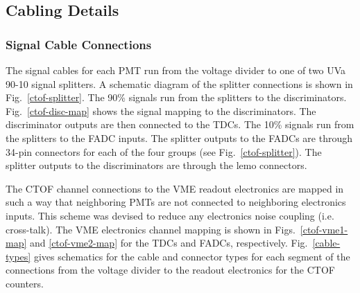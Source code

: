 \documentclass[12pt]{article}
\begin{document}
\subsection{Cabling Details}

\subsubsection{Signal Cable Connections}
\label{signal-conn}

The signal cables for each PMT run from the voltage divider to one of two UVa 90-10 signal
splitters. A schematic diagram of the splitter connections is shown in Fig.~\ref{ctof-splitter}. 
The 90\% signals run from the splitters to the discriminators. Fig.~\ref{ctof-disc-map} shows
the signal mapping to the discriminators. The discriminator outputs are then connected to the
TDCs. The 10\% signals run from the splitters to the FADC inputs. The splitter outputs to the 
FADCs are through 34-pin connectors for each of the four groups (see Fig.~\ref{ctof-splitter}).
The splitter outputs to the discriminators are through the lemo connectors.

The CTOF channel connections to the VME readout electronics are mapped in such a way that 
neighboring PMTs are not connected to neighboring electronics inputs. This scheme was devised to 
reduce any electronics noise coupling (i.e. cross-talk). The VME electronics channel mapping is 
shown in Figs.~\ref{ctof-vme1-map} and \ref{ctof-vme2-map} for the TDCs and FADCs, respectively. 
Fig.~\ref{cable-types} gives schematics for the cable and connector types for each segment of the 
connections from the voltage divider to the readout electronics for the CTOF counters.
\end{document}
